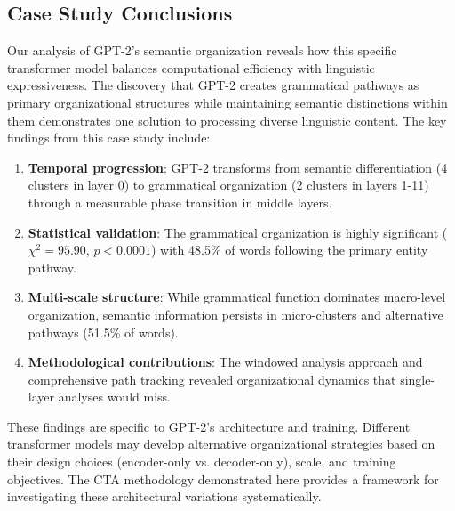 \subsection{Case Study Conclusions}

Our analysis of GPT-2's semantic organization reveals how this specific transformer model balances computational efficiency with linguistic expressiveness. The discovery that GPT-2 creates grammatical pathways as primary organizational structures while maintaining semantic distinctions within them demonstrates one solution to processing diverse linguistic content. The key findings from this case study include:

\begin{enumerate}
    \item \textbf{Temporal progression}: GPT-2 transforms from semantic differentiation (4 clusters in layer 0) to grammatical organization (2 clusters in layers 1-11) through a measurable phase transition in middle layers.
    
    \item \textbf{Statistical validation}: The grammatical organization is highly significant ($\chi^2 = 95.90$, $p < 0.0001$) with 48.5\% of words following the primary entity pathway.
    
    \item \textbf{Multi-scale structure}: While grammatical function dominates macro-level organization, semantic information persists in micro-clusters and alternative pathways (51.5\% of words).
    
    \item \textbf{Methodological contributions}: The windowed analysis approach and comprehensive path tracking revealed organizational dynamics that single-layer analyses would miss.
\end{enumerate}

These findings are specific to GPT-2's architecture and training. Different transformer models may develop alternative organizational strategies based on their design choices (encoder-only vs. decoder-only), scale, and training objectives. The CTA methodology demonstrated here provides a framework for investigating these architectural variations systematically.
